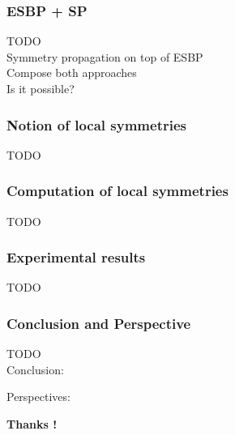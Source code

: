 \documentclass{beamer}
\begin{document}

\begin{frame}
\frametitle{ESBP + SP}
TODO\\

Symmetry propagation on top of ESBP\\

Compose both approaches\\

Is it possible?

\end{frame}


\begin{frame}
\frametitle{Notion of local symmetries}
TODO\\

\end{frame}


\begin{frame}
\frametitle{Computation of local symmetries}
TODO\\

\end{frame}

\begin{frame}
\frametitle{Experimental results}
TODO\\

\end{frame}



\begin{frame}
\frametitle{Conclusion and Perspective}
TODO\\
Conclusion:

Perspectives:

\vfill
\textbf{Thanks !}
\end{frame}
\end{document}
